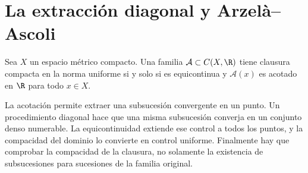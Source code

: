 \section{La extracción diagonal y Arzelà--Ascoli}
\begin{teorema}\label{ch27:ascoli}
Sea $X$ un espacio métrico compacto. Una familia $\mathcal A\subset C(X,\R)$ tiene clausura compacta en la norma uniforme si y solo si es equicontinua y $\mathcal A(x)$ es acotado en $\R$ para todo $x\in X$.
\end{teorema}
\begin{estrategia}
La acotación permite extraer una subsucesión convergente en un punto. Un procedimiento diagonal hace que una misma subsucesión converja en un conjunto denso numerable. La equicontinuidad extiende ese control a todos los puntos, y la compacidad del dominio lo convierte en control uniforme. Finalmente hay que comprobar la compacidad de la clausura, no solamente la existencia de subsucesiones para sucesiones de la familia original.
\end{estrategia}
